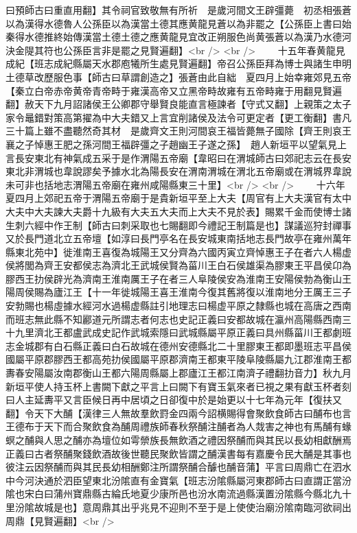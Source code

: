 曰預師古曰重直用翻】其令祠官致敬無有所祈　是歲河間文王辟彊薨　初丞相張蒼以為漢得水德魯人公孫臣以為漢當土德其應黄龍見蒼以為非罷之【公孫臣上書曰始秦得水德推終始傳漢當土德土德之應黄龍見宜改正朔服色尚黄張蒼以為漢乃水德河決金隄其符也公孫臣言非是罷之見賢遍翻】<br />
<br />
　　十五年春黄龍見成紀【班志成紀縣屬天水郡庖犧所生處見賢遍翻】帝召公孫臣拜為博士與諸生申明土德草改歷服色事【師古曰草謂創造之】張蒼由此自絀　夏四月上始幸雍郊見五帝【秦立白帝赤帝黄帝青帝畤于雍漢高帝又立黑帝畤故雍有五帝畤雍于用翻見賢遍翻】赦天下九月詔諸侯王公卿郡守舉賢良能直言極諫者【守式又翻】上親策之太子家令鼂錯對策高第擢為中大夫錯又上言宜削諸侯及法令可更定者【更工衡翻】書凡三十篇上雖不盡聽然奇其材　是歲齊文王則河間哀王福皆薨無子國除【齊王則哀王襄之子悼惠王肥之孫河間王福辟彊之子趙幽王子遂之孫】　趙人新垣平以望氣見上言長安東北有神氣成五采于是作渭陽五帝廟【韋昭曰在渭城師古曰郊祀志云在長安東北非渭城也韋說謬矣予據水北為陽長安在渭南渭城在渭北五帝廟或在渭城界韋說未可非也括地志渭陽五帝廟在雍州咸陽縣東三十里】<br />
<br />
　　十六年夏四月上郊祀五帝于渭陽五帝廟于是貴新垣平至上大夫【周官有上大夫漢官有太中大夫中大夫諫大夫爵十九級有大夫五大夫而上大夫不見於表】賜累千金而使博士諸生刺六經中作王制【師古曰刺采取也七賜翻即今禮記王制篇是也】謀議巡狩封禪事又於長門道北立五帝壇【如淳曰長門亭名在長安城東南括地志長門故亭在雍州萬年縣東北苑中】徙淮南王喜復為城陽王又分齊為六國丙寅立齊悼惠王子在者六人楊虚侯將閭為齊王安都侯志為濟北王武城侯賢為菑川王白石侯雄渠為膠東王平昌侯卬為膠西王扐侯辟光為濟南王淮南厲王子在者三人阜陵侯安為淮南王安陽侯勃為衡山王陽周侯賜為廬江王【十一年徙城陽王喜王淮南今復其舊將復以淮南地分王厲王三子安勃賜也楊虛據水經河水過楊虚縣註引地理志曰楊虚平原之隸縣也城在高唐之西南而班志無此縣不知酈道元所謂志者何志也史記正義曰安都故城在瀛州高陽縣西南三十九里濟北王都盧武成史記作武城索隱曰武城縣屬平原正義曰具州縣菑川王都劇班志金城郡有白石縣正義曰白石故城在德州安德縣北二十里膠東王都即墨班志平昌侯國屬平原郡膠西王都高苑扐侯國屬平原郡濟南王都東平陵阜陵縣屬九江郡淮南王都夀春安陽屬汝南郡衡山王都六陽周縣屬上郡廬江王都江南濟子禮翻扐音力】秋九月新垣平使人持玉杯上書闕下獻之平言上曰闕下有寶玉氣來者已視之果有獻玉杯者刻曰人主延夀平又言臣候日再中居頃之日卻復中於是始更以十七年為元年【復扶又翻】令天下大酺【漢律三人無故羣飲罸金四兩今詔横賜得會聚飲食師古曰酺布也言王德布于天下而合聚飲食為酺周禮族師春秋祭酺注酺者為人烖害之神也有馬酺有蝝螟之酺與人思之酺亦為壇位如雩禜族長無飲酒之禮因祭酺而與其民以長幼相獻酬焉正義曰古者祭酺聚錢飲酒故後世聽民聚飲皆謂之酺漢書每有嘉慶令民大酺是其事也彼注云因祭酺而與其民長幼相酬鄭注所謂祭酺合醵也酺音蒲】平言曰周鼎亡在泗水中今河決通於泗臣望東北汾隂直有金寶氣【班志汾隂縣屬河東郡師古曰直謂正當汾隂也宋白曰蒲州寶鼎縣古綸氏地夏少康所邑也汾水南流過縣漢置汾隂縣今縣北九十里汾隂故城是也】意周鼎其出乎兆見不迎則不至于是上使使治廟汾隂南臨河欲祠出周鼎【見賢遍翻】<br />
